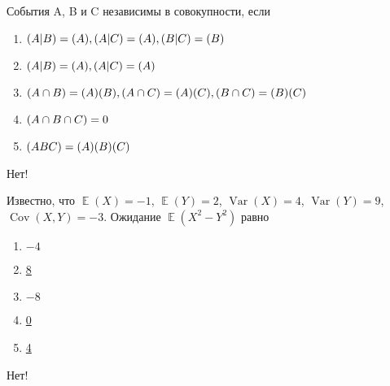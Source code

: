 \documentclass[t]{beamer}
\DeclareMathOperator{\Var}{Var}
\DeclareMathOperator{\Cov}{Cov}
\DeclareMathOperator{\E}{\mathbb{E}}
\let\P\relax
\DeclareMathOperator{\P}{\mathbb{P}}
\begin{document}
 \begin{frame} \label{16-No} 
\begin{block}{16} 

События A, B и C независимы в совокупности, если


 \end{block} 
\begin{enumerate} 
\item[] \hyperlink{16-No}{\beamergotobutton{}  $\P(A|B) = \P(A), \P(A|C) = \P(A), \P(B|C) = \P(B)$ }
\item[] \hyperlink{16-No}{\beamergotobutton{}  $\P(A|B) = \P(A), \P(A|C) = \P(A)$ }
\item[] \hyperlink{16-No}{\beamergotobutton{}  $\P(A\cap B) = \P(A)\P(B), \P(A\cap C) = \P(A)\P(C), \P(B\cap C) = \P(B)\P(C)$ }
\item[] \hyperlink{16-No}{\beamergotobutton{}  $\P(A \cap B \cap C) = 0$ }
\item[] \hyperlink{16-No}{\beamergotobutton{}  $\P(ABC) = \P(A) \P(B) \P(C)$ }
\end{enumerate} 

 \alert{Нет!} 
\end{frame} 


 \begin{frame} \label{17-No} 
\begin{block}{17} 

Известно, что $\E(X)=-1$, $\E(Y)=2$, $\Var(X)=4$, $\Var(Y)=9$, $\Cov(X,Y)=-3$. Ожидание $\E(X^2-Y^2)$ равно

  


 \end{block} 
\begin{enumerate} 
\item[] \hyperlink{17-No}{\beamergotobutton{} $-4$}
\item[] \hyperlink{17-No}{\beamergotobutton{} 8}
\item[] \hyperlink{17-Yes}{\beamergotobutton{} $-8$}
\item[] \hyperlink{17-No}{\beamergotobutton{} 0}
\item[] \hyperlink{17-No}{\beamergotobutton{} 4}
\end{enumerate} 

 \alert{Нет!} 
\end{frame} 
\end{document}

